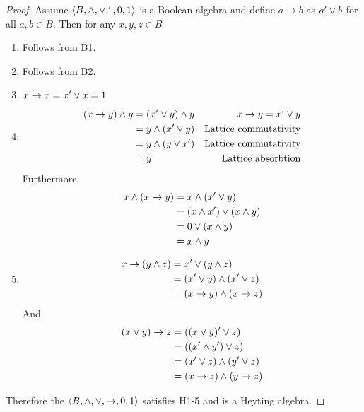 \begin{proof}
Assume $\langle B, \wedge, \vee, ', 0 , 1\rangle$ is a Boolean algebra and define $a\to b$ as $a'\vee b$ for all $a, b \in B$.
Then for any $x, y, z \in B$
\begin{enumerate}[(H1)]
  \item Follows from B1.
  \item Follows from B2.
  \item $x\to x = x'\vee x = 1$
  \item 
    \begin{align*}
      (x\to y) \wedge y &= (x' \vee y) \wedge y & \text{$x\to y = x' \vee y$} \\
                       &= y \wedge (x' \vee y) & \text{Lattice commutativity} \\
                       &= y \wedge (y \vee x') & \text{Lattice commutativity}\\
                       &= y                    & \text{Lattice absorbtion}
    \end{align*}
    Furthermore
    \begin{align*}
      x \wedge (x\to y) &= x \wedge (x' \vee y) \\
                       &= (x \wedge x') \vee (x \wedge y) \\
                       &= 0 \vee (x \wedge y) \\
                       &= x \wedge y \\
    \end{align*}
  \item 
    \begin{align*}
      x \to (y \wedge z) &= x' \vee (y \wedge z) \\ 
                        &= (x' \vee y) \wedge (x' \vee z) \\
                        &= (x \to y) \wedge (x \to z)
    \end{align*}
    And
    \begin{align*}
      (x \vee y) \to z &= ((x \vee y)' \vee z) \\
                        &= ((x' \wedge y') \vee z) \\
                        &= (x'\vee z) \wedge (y'\vee z) \\
                        &= (x\to z) \wedge (y\to z)
    \end{align*}
\end{enumerate}
Therefore the $\langle B, \wedge, \vee, \to, 0, 1\rangle$ satisfies H1-5 and is a Heyting algebra.
\end{proof}

